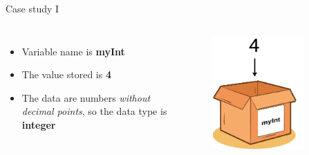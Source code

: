 \documentclass[10pt,xcolor={table,dvipsnames},t]{beamer}
\begin{document}
\begin{frame}{Case study I}
  \begin{columns}
    \begin{itemize}
      \item Variable name is \textbf{myInt}
      \item The value stored is \textbf{4}
      \item The data are numbers \textit{without decimal points}, so the data type is \textbf{integer}
    \end{itemize}
    \begin{figure}
      \includegraphics[width=0.8\textwidth]{img/variable-int.png}
    \end{figure}
  \end{columns}
\end{frame}
\end{document}
